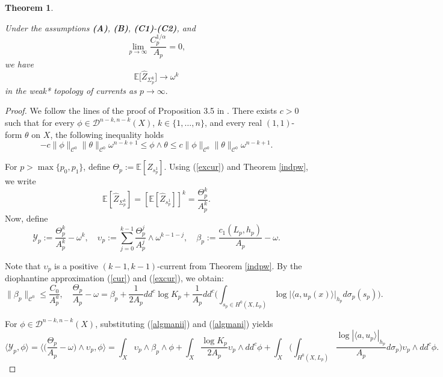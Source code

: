 \documentclass[11pt,leqno,oneside]{amsart}
\newtheorem{thm}{Theorem}[section]
\numberwithin{equation}{section}
\begin{document}
\begin{thm}\label{exdist}
	
	Under the assumptions \textbf{(A)}, \textbf{(B)}, \textbf{(C1)}-\textbf{(C2)}, and   \begin{equation}\label{poscon} \lim_{p\rightarrow \infty}{\frac{C_{p}^{1/\alpha}}{A_{p}}}=0, \end{equation} we have
	\begin{equation*}
		\mathbb{E}\big[\widehat{Z}_{\Sigma_{p}^{k}}\big]\longrightarrow \omega^k
	\end{equation*}
	in the weak* topology of currents as $p\rightarrow \infty.$
\end{thm}
\begin{proof}
	
	We follow the lines of the proof of Proposition 3.5 in \cite{CLMM}. There exists $c > 0$ such that for every $\phi \in \mathcal{D}^{n-k, n-k}(X)$, $k \in \{1, \dots, n\}$, and every real $(1,1)$-form $\theta$ on $X$, the following inequality holds
	\begin{equation}\label{form2}
		-c\|\phi\|_{\mathscr{C}^0} \|\theta\|_{\mathscr{C}^0} \omega^{n-k+1} \leq \phi \wedge \theta \leq c\|\phi\|_{\mathscr{C}^0} \|\theta\|_{\mathscr{C}^0} \omega^{n-k+1}.
	\end{equation}
	
	For $p > \max\{p_0, p_1\}$, define $\Theta_p := \mathbb{E}[Z_{s^1_p}]$. Using (\ref{excur}) and Theorem \ref{indpw}, we write
	$$
	\mathbb{E}[\widehat{Z}_{\Sigma^k_p}] = [\mathbb{E}[\widehat{Z}_{s^1_p}]]^k = \frac{\Theta_p^k}{A_p^k}.$$
	Now, define
	\begin{equation}\label{algmanii}
		\mathcal{Y}_p := \frac{\Theta_p^k}{A_p^k} - \omega^k, \quad \upsilon_p := \sum_{j=0}^{k-1} \frac{\Theta_p^j}{A_p^j} \wedge \omega^{k-1-j}, \quad \beta_p := \frac{c_1(L_p, h_p)}{A_p} - \omega.
	\end{equation}
	
	Note that $\upsilon_{p}$ is a positive $(k-1, k-1)$-current from Theorem \ref{indpw}. By the diophantine approximation (\ref{cur}) and (\ref{excur}), we obtain:
	\begin{equation}\label{algmani}
		\|\beta_p\|_{\mathscr{C}^0} \leq \frac{C_0}{A_p^a}, \quad \frac{\Theta_p}{A_p} - \omega = \beta_p + \frac{1}{2A_p} dd^c \log K_p + \frac{1}{A_p} dd^c \Bigg( \int_{s_p \in H^0(X, L_p)} \log\big|\langle a, u_p(x)\rangle\big|_{h_p} d\sigma_p(s_p) \Bigg).
	\end{equation}
	
	For $\phi \in \mathcal{D}^{n-k, n-k}(X)$, substituting (\ref{algmanii}) and (\ref{algmani}) yields
	\begin{equation}\label{mainesti}
		\langle \mathcal{Y}_p, \phi \rangle = \langle \Big(\frac{\Theta_p}{A_p} - \omega\Big) \wedge \upsilon_p, \phi \rangle = \int_X \upsilon_p \wedge \beta_p \wedge \phi + \int_X \frac{\log K_p}{2A_p} \upsilon_p \wedge dd^c \phi + \int_X \Bigg( \int_{H^0(X, L_p)} \frac{\log|\langle a, u_p\rangle|_{h_p}}{A_p} d\sigma_p \Bigg) \upsilon_p \wedge dd^c \phi.
	\end{equation}
	

\end{proof}
\end{document}
